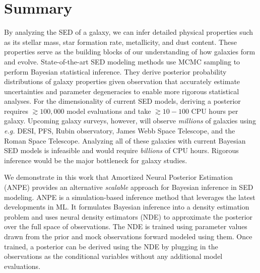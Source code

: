 \section{Summary} \label{sec:summary}
By analyzing the SED of a galaxy, we can infer detailed physical properties
such as its stellar mass, star formation rate, metallicity, and dust content. 
These properties serve as the building blocks of our understanding of how
galaxies form and evolve. 
State-of-the-art SED modeling methods use MCMC sampling to perform Bayesian
statistical inference. 
They derive posterior probability distributions of galaxy properties given
observation that accurately estimate uncertainties and parameter degeneracies
to enable more rigorous statistical analyses. 
For the dimensionality of current SED models, deriving a posterior requires 
${\gtrsim}100,000$ model evaluations and take ${\gtrsim}10-100$ CPU hours per 
galaxy. 
Upcoming galaxy surveys, however, will observe \emph{millions} of galaxies
using \emph{e.g.} DESI, PFS, Rubin observatory, James Webb Space Telescope, and
the Roman Space Telescope. 
Analyzing all of these galaxies with current Bayesian SED models is infeasible
and would require \emph{billions} of CPU hours. 
Rigorous inference would be the major bottleneck for galaxy studies. 

We demonstrate in this work that Amortized Neural Posterior Estimation (ANPE)
provides an alternative \emph{scalable} approach for Bayesian inference in SED
modeling. 
ANPE is a simulation-based inference method that leverages the latest
developments in ML.
It formulates Bayesian inference into a density estimation problem and uses 
neural density estimators (NDE) to approximate the posterior over the full
space of observations. 
The NDE is trained using parameter values drawn from the prior and mock
observations forward modeled using them.  
Once trained, a posterior can be derived using the NDE by plugging in the observations as the conditional variables without any additional model evaluations. 


